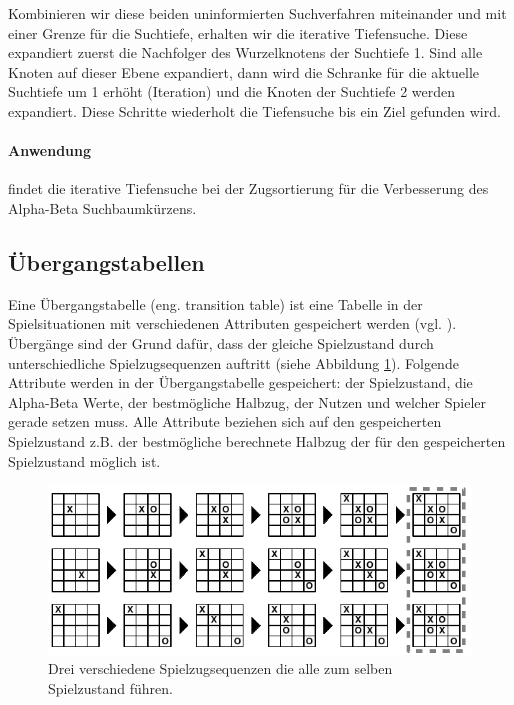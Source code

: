 Kombinieren wir diese beiden uninformierten Suchverfahren miteinander und mit einer Grenze für die Suchtiefe, erhalten wir die iterative Tiefensuche. Diese expandiert zuerst die Nachfolger des Wurzelknotens der Suchtiefe 1. Sind alle Knoten auf dieser Ebene expandiert, dann wird die Schranke für die aktuelle Suchtiefe um 1 erhöht (Iteration) und die Knoten der Suchtiefe 2 werden expandiert. Diese Schritte wiederholt die Tiefensuche bis ein Ziel gefunden wird.  

\paragraph{Anwendung} findet die iterative Tiefensuche bei der Zugsortierung für die Verbesserung des Alpha-Beta Suchbaumkürzens. 


\subsection{Übergangstabellen}
\label{subsec:Übergangstabellen}
Eine Übergangstabelle (eng. transition table) ist eine Tabelle in der Spielsituationen mit verschiedenen Attributen gespeichert werden (vgl. \cite[215\psq]{Russell}). Übergänge sind der Grund dafür, dass der gleiche Spielzustand durch unterschiedliche Spielzugsequenzen auftritt (siehe Abbildung \ref{fig:transitionen_tictactoe}). Folgende Attribute werden in der Übergangstabelle gespeichert: der Spielzustand, die Alpha-Beta Werte, der bestmögliche Halbzug, der Nutzen und welcher Spieler gerade setzen muss. Alle Attribute beziehen sich auf den gespeicherten Spielzustand z.B. der bestmögliche berechnete Halbzug der für den gespeicherten Spielzustand möglich ist. \\

\begin{figure}[!htbp]
  \centering
  \includegraphics{inhalt/abbildungen/transitionen_tictactoe.pdf}
  \caption{Drei verschiedene Spielzugsequenzen die alle zum selben Spielzustand führen.}
  \label{fig:transitionen_tictactoe}
\end{figure} 

